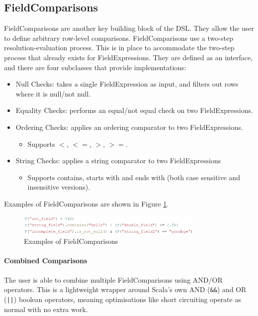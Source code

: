 
\subsection{FieldComparisons}
FieldComparisons are another key building block of the DSL. They allow the user to define arbitrary row-level comparisons. FieldComparisons use a two-step resolution-evaluation process. This is in place to accommodate the two-step process that already exists for FieldExpressions. They are defined as an interface, and there are four subclasses that provide implementations:

\begin{itemize}
	\item Null Checks: takes a single FieldExpression as input, and filters out rows where it is null/not null.
	\item Equality Checks: performs an equal/not equal check on two FieldExpressions.
	\item Ordering Checks: applies an ordering comparator to two FieldExpressions.
	\begin{itemize}
		\item Supports $<$, $<=$, $>$, $>=$.
	\end{itemize}
	\item String Checks: applies a string comparator to two FieldExpressions
	\begin{itemize}
		\item Supports contains, starts with and ends with (both case sensitive and insensitive versions).
	\end{itemize}
\end{itemize}

Examples of FieldComparisons are shown in Figure \ref{fig:field-comparisons-examples}.

\begin{figure}[h]
	\centering
	\includegraphics[width=0.8\textwidth]{chapters/diagrams/implementation/field-comparisons-examples}
	\caption{Examples of FieldComparisons}
	\label{fig:field-comparisons-examples}
\end{figure}

\paragraph{Combined Comparisons}
The user is able to combine multiple FieldComparisons using AND/OR operators. This is a lightweight wrapper around Scala's own AND (\texttt{\&\&}) and OR (\texttt{||}) boolean operators, meaning optimisations like short circuiting operate as normal with no extra work.

